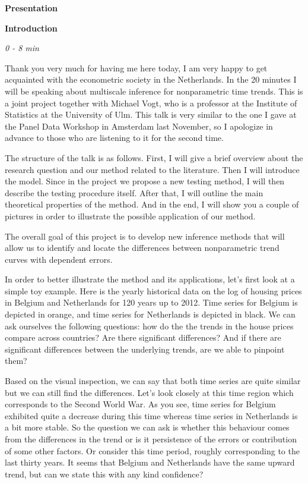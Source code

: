 \documentclass[a4paper,12pt]{article}
\begin{document}
\begin{center}
\Large{\textbf{Presentation}}
\end{center}
\textbf{Introduction}

\emph{0 - 8 min}

Thank you very much for having me here today, I am very happy to get acquainted with the econometric society in the Netherlands. In the 20 minutes I will be speaking about multiscale inference for nonparametric time trends. This is a joint project together with Michael Vogt, who is a professor at the Institute of Statistics at the University of Ulm. This talk is very similar to the one I gave at the Panel Data Workshop in Amsterdam last November, so I apologize in advance to those who are listening to it for the second time.

The structure of the talk is as follows. First, I will give a brief overview about the research question and our method related to the literature. Then I will introduce the model. Since in the project we propose a new testing method, I will then describe the testing procedure itself. After that, I will outline the main theoretical properties of the method. And in the end, I will show you a couple of pictures in order to illustrate the possible application of our method.

The overall goal of this project is to develop new inference methods that will allow us to identify and locate the differences between nonparametric trend curves with dependent errors. 

In order to better illustrate the method and its applications, let's first look at a simple toy example. Here is the yearly historical data on the log of housing prices in Belgium and Netherlands for 120 years up to 2012. Time series for Belgium is depicted in orange, and time series for Netherlands is depicted in black. We can ask ourselves the following questions: how do the the trends in the house prices compare across countries? Are there significant differences? And if there are significant differences between the underlying trends, are we able to pinpoint them?

Based on the visual inspection, we can say that both time series are quite similar but we can still find the differences. Let's look closely at this time region which corresponds to the Second World War. As you see, time series for Belgium exhibited quite a decrease during this time whereas time series in Netherlands is a bit more stable. So the question we can ask is whether this behaviour comes from the differences in the trend or is it persistence of the errors or contribution of some other factors. Or consider this time period, roughly corresponding to the last thirty years. It seems that Belgium and Netherlands have the same upward trend, but can we state this with any kind confidence?
\end{document}

